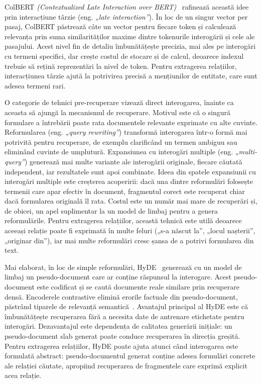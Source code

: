 ColBERT \textit{(Contextualized Late Interaction over BERT)}~\cite{khattab2020colbert} rafinează această idee prin interacțiune târzie (eng. \textit{„late interaction”}). În loc de un singur vector per pasaj, ColBERT păstrează câte un vector pentru fiecare token și calculează relevanța prin suma similarităților maxime dintre tokenurile interogării și cele ale pasajului. Acest nivel fin de detaliu îmbunătățește precizia, mai ales pe interogări cu termeni specifici, dar crește costul de stocare și de calcul, deoarece indexul trebuie să rețină reprezentări la nivel de token. Pentru extragerea relațiilor, interacțiunea târzie ajută la potrivirea precisă a mențiunilor de entitate, care sunt adesea termeni rari.

O categorie de tehnici pre-recuperare vizează direct interogarea, înainte ca aceasta să ajungă la mecanismul de recuperare. Motivul este că o singură formulare a întrebării poate rata documentele relevante exprimate cu alte cuvinte. Reformularea (eng. \textit{„query rewriting”}) transformă interogarea într-o formă mai potrivită pentru recuperare, de exemplu clarificând un termen ambiguu sau eliminând cuvinte de umplutură. Expansiunea cu interogări multiple (eng. \textit{„multi-query”}) generează mai multe variante ale interogării originale, fiecare căutată independent, iar rezultatele sunt apoi combinate. Ideea din spatele expansiunii cu interogări multiple este creșterea acoperirii: dacă una dintre reformulări folosește termenii care apar efectiv în document, fragmentul corect este recuperat chiar dacă formularea originală îl rata. Costul este un număr mai mare de recuperări și, de obicei, un apel suplimentar la un model de limbaj pentru a genera reformulările. Pentru extragerea relațiilor, această tehnică este utilă deoarece aceeași relație poate fi exprimată în multe feluri („s-a născut la”, „locul nașterii”, „originar din”), iar mai multe reformulări cresc șansa de a potrivi formularea din text.

Mai elaborat, în loc de simple reformulări, HyDE~\cite{gao2023hyde} generează cu un model de limbaj un pseudo-document care ar conține răspunsul la interogare. Acest pseudo-document este codificat și se caută documente reale similare prin recuperare densă. Encoderele contrastive elimină erorile factuale din pseudo-document, păstrând tiparele de relevanță semantică~\cite{gao2023hyde}. Avantajul principal al HyDE este că îmbunătățește recuperarea fără a necesita date de antrenare etichetate pentru interogări. Dezavantajul este dependența de calitatea generării inițiale: un pseudo-document slab generat poate conduce recuperarea în direcția greșită. Pentru extragerea relațiilor, HyDE poate ajuta atunci când interogarea este formulată abstract: pseudo-documentul generat conține adesea formulări concrete ale relației căutate, apropiind recuperarea de fragmentele care exprimă explicit acea relație.

